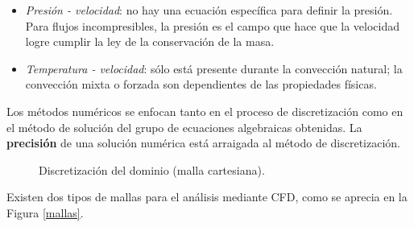 \begin{itemize}
	\item \textit{Presi\'on - velocidad}: no hay una ecuaci\'on espec\'ifica para definir la presi\'on. Para flujos incompresibles, la presi\'on es el campo que hace que la velocidad logre cumplir la ley de la conservaci\'on de la masa.
	\item \textit{Temperatura - velocidad}: s\'olo est\'a presente durante la convecci\'on natural; la convecci\'on mixta o forzada son dependientes de las propiedades f\'isicas.
\end{itemize}

\noindent
\justify

Los m\'etodos num\'ericos se enfocan tanto en el proceso de discretizaci\'on como en el m\'etodo de soluci\'on del grupo de ecuaciones algebraicas obtenidas. La \textbf{precisi\'on} de una soluci\'on num\'erica est\'a arraigada al m\'etodo de discretizaci\'on.

\begin{figure}[h!]
	\centering
	\caption{Discretizaci\'on del dominio (malla cartesiana).}
	\label{elemento}
\end{figure}

\newpage

\noindent
\justify

Existen dos tipos de mallas para el an\'alisis mediante CFD, como se aprecia en la Figura \ref{mallas}.


